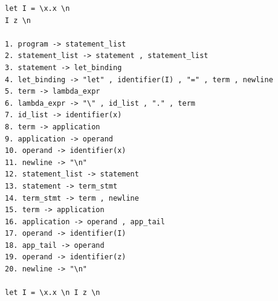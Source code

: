 \documentclass[12pt,a4paper]{article}
\begin{document}
\begin{verbatim}
let I = \x.x \n
I z \n

1. program -> statement_list
2. statement_list -> statement , statement_list
3. statement -> let_binding
4. let_binding -> "let" , identifier(I) , "=" , term , newline
5. term -> lambda_expr
6. lambda_expr -> "\" , id_list , "." , term 
7. id_list -> identifier(x)
8. term -> application
9. application -> operand
10. operand -> identifier(x)
11. newline -> "\n"
12. statement_list -> statement
13. statement -> term_stmt
14. term_stmt -> term , newline
15. term -> application
16. application -> operand , app_tail
17. operand -> identifier(I)
18. app_tail -> operand
19. operand -> identifier(z)
20. newline -> "\n"

let I = \x.x \n I z \n
\end{verbatim}
\end{document}
